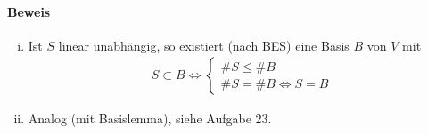  	\paragraph{Beweis}
 		\begin{enumerate}[(i)]
 			\item Ist $ S $ linear unabhängig, so existiert (nach BES) eine Basis $ B $ von $ V $ mit
 			      \begin{gather*}
 			      	S\subset B\Leftrightarrow \left\{
 			      	\begin{array}{l}
 			      		\#S \leq \#B                    \\
 			      		\#S = \#B \Leftrightarrow S = B
 			      	\end{array}
 			      	\right.
 			      \end{gather*}
 			\item Analog (mit Basislemma), siehe Aufgabe 23.
 		\end{enumerate}
